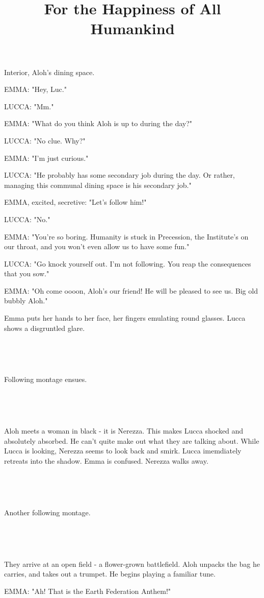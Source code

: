 \documentclass[11pt]{article}
\begin{document}
\ttfamily
\title{For the Happiness of All Humankind}
\maketitle

Interior, Aloh's dining space.

EMMA: "Hey, Luc."

LUCCA: "Mm."

EMMA: "What do you think Aloh is up to during the day?"

LUCCA: "No clue. Why?"

EMMA: "I'm just curious."

LUCCA: "He probably has some secondary job during the day.
Or rather, managing this communal dining space is his secondary job."

EMMA, excited, secretive: "Let's follow him!"

LUCCA: "No."

EMMA: "You're so boring.
Humanity is stuck in Precession, the Institute's on our throat, and you won't even allow us to have some fun."

LUCCA: "Go knock yourself out. 
I'm not following.
You reap the consequences that you sow."

EMMA: "Oh come oooon, Aloh's our friend!
He will be pleased to see us.
Big old bubbly Aloh."

Emma puts her hands to her face, her fingers emulating round glasses.
Lucca shows a disgruntled glare.

\ 

\ 

Following montage ensues.

\ 

\ 

Aloh meets a woman in black - it is Nerezza.
This makes Lucca shocked and absolutely absorbed.
He can't quite make out what they are talking about.
While Lucca is looking, Nerezza seems to look back and smirk.
Lucca imemdiately retreats into the shadow.
Emma is confused.
Nerezza walks away.

\ 

\ 

Another following montage.

\ 

\ 

They arrive at an open field - a flower-grown battlefield.
Aloh unpacks the bag he carries, and takes out a trumpet. 
He begins playing a familiar tune.

EMMA: "Ah! That is the Earth Federation Anthem!"
\end{document}
